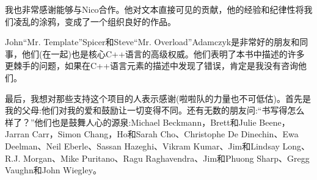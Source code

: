 我也非常感谢能够与Nico合作。他对文本直接可见的贡献，他的经验和纪律性将我们凌乱的涂鸦，变成了一个组织良好的作品。

John“Mr. Template”Spicer和Steve“Mr. Overload”Adamczyk是非常好的朋友和同事，他们(在一起)也是核心C++语言的高级权威。他们表明了本书中描述的许多更棘手的问题，如果在C++语言元素的描述中发现了错误，肯定是我没有咨询他们。

最后，我想对那些支持这个项目的人表示感谢(啦啦队的力量也不可低估)。首先是我的父母:他们对我的爱和鼓励让一切变得不同。还有无数的朋友问:“书写得怎么样了？”他们也是鼓舞人心的源泉:Michael Beckmann，Brett和Julie Beene，Jarran Carr，Simon Chang，Ho和Sarah Cho、Christophe De Dinechin、Ewa Deelman、Neil Eberle、Sassan Hazeghi、Vikram Kumar、Jim和Lindsay Long、R.J. Morgan、Mike Puritano、Ragu Raghavendra、Jim和Phuong Sharp、Gregg Vaughn和John Wiegley。



